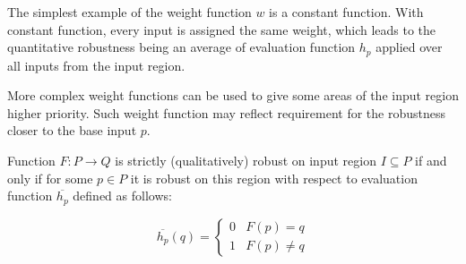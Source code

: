 %
%
%


The simplest example of the weight function $w$ is a constant function.
With constant function, every input is assigned the same weight,
which leads to the quantitative robustness being an average
of evaluation function $h_p$ applied over all inputs from the input region.

More complex weight functions can be used to give some areas of the input region
higher priority. Such weight function may reflect requirement for the robustness
closer to the base input $p$.

\begin{definition}
    Function $F: P\to Q$ is strictly (qualitatively) robust on input region $I\subseteq P$
    if and only if for some $p\in P$ it is robust on this region with respect
    to evaluation function $\overline{h_p}$ defined as follows:

    \begin{equation*}
        \overline{h_p}(q) = \left\{\begin{matrix}
            0 & F(p) = q\\
            1 & F(p) \neq q
        \end{matrix}\right.
    \end{equation*}
\end{definition}

